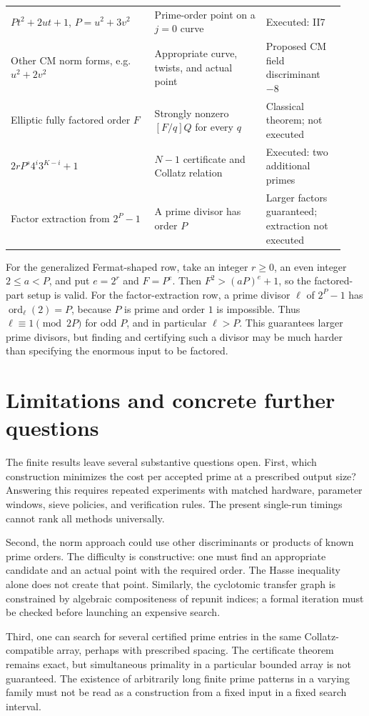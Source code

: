 \documentclass[11pt,a4paper]{article}
\theoremstyle{definition}\newtheorem{definition}[theorem]{Definition}
\theoremstyle{remark}\newtheorem{remark}[theorem]{Remark}
\newcommand{\ord}{\operatorname{ord}}\newcommand{\rad}{\operatorname{rad}}
\begin{document}
{\begin{longtable}{@{}>{\raggedright\arraybackslash}p{0.40\linewidth}>{\raggedright\arraybackslash}p{0.31\linewidth}>{\raggedright\arraybackslash}p{0.22\linewidth}@{}}
$Pt^2+2ut+1$, $P=u^2+3v^2$ & Prime-order point on a $j=0$ curve & Executed: II7\\
Other CM norm forms, e.g. $u^2+2v^2$ & Appropriate curve, twists, and actual point & Proposed CM field discriminant $-8$\\
Elliptic fully factored order $F$ & Strongly nonzero $[F/q]Q$ for every $q$ & Classical theorem; not executed\\
$2rP^s4^i3^{K-i}+1$ & $N-1$ certificate and Collatz relation & Executed: two additional primes\\
Factor extraction from $2^P-1$ & A prime divisor has order $P$ & Larger factors guaranteed; extraction not executed\\
\end{longtable}}

For the generalized Fermat-shaped row, take an integer $r\ge0$, an even
integer $2\le a<P$, and put $e=2^r$ and $F=P^e$.
Then $F^2>(aP)^e+1$, so the factored-part setup is valid.
For the factor-extraction row, a prime divisor $\ell$ of $2^P-1$ has
$\ord_\ell(2)=P$, because $P$ is prime and order $1$ is impossible.
Thus $\ell\equiv1\pmod{2P}$ for odd $P$, and in particular $\ell>P$.
This guarantees larger prime divisors, but finding and certifying such a
divisor may be much harder than specifying the enormous input to be factored.

\section{Limitations and concrete further questions}
\label{sec:limits}

The finite results leave several substantive questions open. First, which
construction minimizes the cost per accepted prime at a prescribed output
size? Answering this requires repeated experiments with matched hardware,
parameter windows, sieve policies, and verification rules. The present
single-run timings cannot rank all methods universally.

Second, the norm approach could use other discriminants or products of
known prime orders. The difficulty is constructive: one must find an
appropriate candidate and an actual point with the required order. The
Hasse inequality alone does not create that point. Similarly, the
cyclotomic transfer graph is constrained by algebraic compositeness of
repunit indices; a formal iteration must be checked before launching an
expensive search.

Third, one can search for several certified prime entries in the same
Collatz-compatible array, perhaps with prescribed spacing. The certificate
theorem remains exact, but simultaneous primality in a particular bounded
array is not guaranteed. The existence of arbitrarily long finite prime
patterns in a varying family must not be read as a construction from a
fixed input in a fixed search interval.
\end{document}
